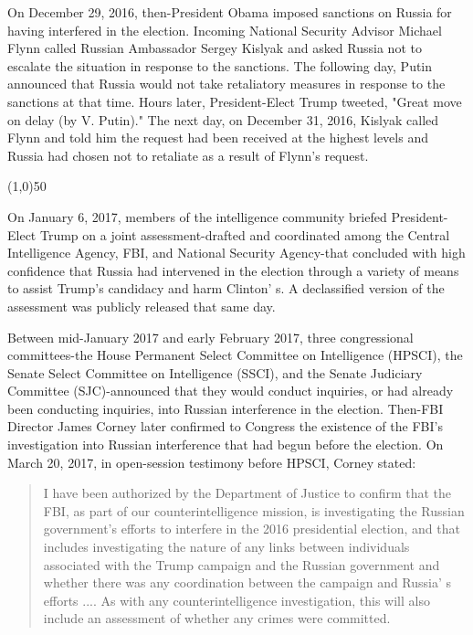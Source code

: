 \documentclass{article}
\newcommand{\hr}{\begin{center} \line(1,0){50} \end{center}}
\begin{document}
On December 29, 2016, then-President Obama imposed sanctions on Russia for having interfered in the election. Incoming National Security Advisor Michael Flynn called Russian Ambassador Sergey Kislyak and asked Russia not to escalate the situation in response to the sanctions. The following day, Putin announced that Russia would not take retaliatory measures in response to the sanctions at that time. Hours later, President-Elect Trump tweeted, "Great move on delay (by V. Putin)." The next day, on December 31, 2016, Kislyak called Flynn and told him the request had been received at the highest levels and Russia had chosen not to retaliate as a result of Flynn's request.

\hr

On January 6, 2017, members of the intelligence community briefed President-Elect Trump on a joint assessment-drafted and coordinated among the Central Intelligence Agency, FBI, and National Security Agency-that concluded with high confidence that Russia had intervened in the election through a variety of means to assist Trump's candidacy and harm Clinton' s. A declassified version of the assessment was publicly released that same day.

Between mid-January 2017 and early February 2017, three congressional committees-the House Permanent Select Committee on Intelligence (HPSCI), the Senate Select Committee on Intelligence (SSCI), and the Senate Judiciary Committee (SJC)-announced that they would conduct inquiries, or had already been conducting inquiries, into Russian interference in the election. Then-FBI Director James Corney later confirmed to Congress the existence of the FBI's investigation into Russian interference that had begun before the election. On March 20, 2017, in open-session testimony before HPSCI, Corney stated:

\begin{quote}
I have been authorized by the Department of Justice to confirm that the FBI, as part of our counterintelligence mission, is investigating the Russian government's efforts to interfere in the 2016 presidential election, and that includes investigating the nature of any links between individuals associated with the Trump campaign and the Russian government and whether there was any coordination between the campaign and Russia' s  efforts .... As with any counterintelligence investigation, this will also include an assessment of whether any crimes were committed.
\end{quote}
\end{document}
